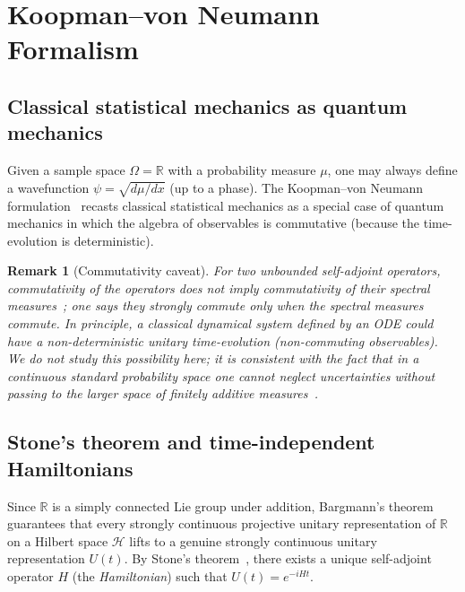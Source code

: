 \documentclass[11pt,a4paper]{article}
\newtheorem{remark}{Remark}
\newcommand{\Rset}{\mathbb{R}}
\newcommand{\Hil}{\mathcal{H}}
\begin{document}
\section{Koopman--von Neumann Formalism}\label{sec:koopman}

\subsection{Classical statistical mechanics as quantum mechanics}

Given a sample space $\Omega=\Rset$ with a probability measure $\mu$, one
may always define a wavefunction $\psi=\sqrt{d\mu/dx}$ (up to a phase).
The Koopman--von Neumann
formulation~\cite{Sudarshan1976Interaction,PhysRevResearch.2.043102,BEVANDA2021197}
recasts classical statistical mechanics as a special case of quantum
mechanics in which the algebra of observables is commutative (because the
time-evolution is deterministic).

\begin{remark}[Commutativity caveat]
For two \emph{unbounded} self-adjoint operators, commutativity of the
operators does \emph{not} imply commutativity of their spectral
measures~\cite{schmuxfcdgen2012unbounded}; one says they \emph{strongly
commute} only when the spectral measures commute.  In principle, a
classical dynamical system defined by an ODE could have a
non-deterministic unitary time-evolution (non-commuting observables).  We
do not study this possibility here; it is consistent with the fact that
in a continuous standard probability space one cannot neglect
uncertainties without passing to the larger space of finitely additive
measures~\cite{book}.
\end{remark}

\subsection{Stone's theorem and time-independent Hamiltonians}

Since $\Rset$ is a simply connected Lie group under addition, Bargmann's
theorem~\cite{cassinelli2004theory,SIMMS1971283} guarantees that every
strongly continuous projective unitary representation of $\Rset$ on a
Hilbert space $\Hil$ lifts to a genuine strongly continuous unitary
representation $U(t)$.  By Stone's
theorem~\cite{cassinelli2004theory,SIMMS1971283}, there exists a unique
self-adjoint operator $H$ (the \emph{Hamiltonian}) such that
$U(t)=e^{-iHt}$.
\end{document}
